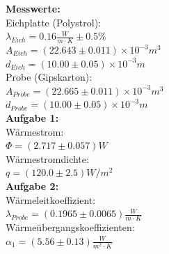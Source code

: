 \documentclass[12pt,a4paper]{article}
\begin{document}
\begin{multicols}{2}

\noindent \textbf{Messwerte:}\\
\noindent Eichplatte (Polystrol):\\
$\lambda_{Eich} = 0.16 \frac{W}{m \cdot K}\pm 0.5\%$\\
$A_{Eich}=(22.643 \pm 0.011)\times 10^{-3}m^3 $\\
$d_{Eich}=(10.00 \pm 0.05)\times 10^{-3}m$\\

\noindent Probe (Gipskarton):\\
$A_{Probe}=(22.665 \pm 0.011)\times 10^{-3}m^3$\\
$d_{Probe}=(10.00 \pm 0.05)\times 10^{-3}m$\\

\noindent \textbf{Aufgabe 1:}\\
Wärmestrom:\\
$\Phi = (2.717 \pm 0.057)W$\\
Wärmestromdichte:\\
$q=(120.0 \pm 2.5)W/m^2$\\

\noindent \textbf{Aufgabe 2:}\\
Wärmeleitkoeffizient:\\
$\lambda_{Probe}=(0.1965 \pm 0.0065)\frac{W}{m \cdot K}$\\
Wärmeübergangskoeffizienten:\\
$\alpha_1=(5.56 \pm 0.13 )\frac{W}{m^2 \cdot K}$\\


\end{multicols}
\end{document}
